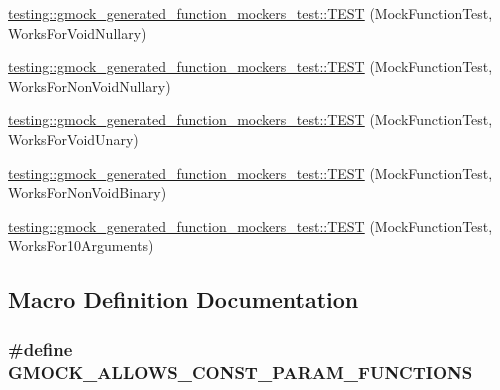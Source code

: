 \begin{DoxyCompactItemize}
\item 
\hyperlink{namespacetesting_1_1gmock__generated__function__mockers__test_a8d67aadbc04fee7e2afc10ee91a76b74}{testing\+::gmock\+\_\+generated\+\_\+function\+\_\+mockers\+\_\+test\+::\+T\+E\+ST} (Mock\+Function\+Test, Works\+For\+Void\+Nullary)
\item 
\hyperlink{namespacetesting_1_1gmock__generated__function__mockers__test_a90817999d7f25ecf280453efb157db84}{testing\+::gmock\+\_\+generated\+\_\+function\+\_\+mockers\+\_\+test\+::\+T\+E\+ST} (Mock\+Function\+Test, Works\+For\+Non\+Void\+Nullary)
\item 
\hyperlink{namespacetesting_1_1gmock__generated__function__mockers__test_ab0e1ede6a1f6ef1774e27f5793a33599}{testing\+::gmock\+\_\+generated\+\_\+function\+\_\+mockers\+\_\+test\+::\+T\+E\+ST} (Mock\+Function\+Test, Works\+For\+Void\+Unary)
\item 
\hyperlink{namespacetesting_1_1gmock__generated__function__mockers__test_ab6337da98bc6bc97100ab177386f3b2b}{testing\+::gmock\+\_\+generated\+\_\+function\+\_\+mockers\+\_\+test\+::\+T\+E\+ST} (Mock\+Function\+Test, Works\+For\+Non\+Void\+Binary)
\item 
\hyperlink{namespacetesting_1_1gmock__generated__function__mockers__test_aa92f0b2b98d76f2c881103a19bed7ba6}{testing\+::gmock\+\_\+generated\+\_\+function\+\_\+mockers\+\_\+test\+::\+T\+E\+ST} (Mock\+Function\+Test, Works\+For10\+Arguments)
\end{DoxyCompactItemize}


\subsection{Macro Definition Documentation}
\subsubsection[{\texorpdfstring{G\+M\+O\+C\+K\+\_\+\+A\+L\+L\+O\+W\+S\+\_\+\+C\+O\+N\+S\+T\+\_\+\+P\+A\+R\+A\+M\+\_\+\+F\+U\+N\+C\+T\+I\+O\+NS}{GMOCK_ALLOWS_CONST_PARAM_FUNCTIONS}}]{\setlength{\rightskip}{0pt plus 5cm}\#define G\+M\+O\+C\+K\+\_\+\+A\+L\+L\+O\+W\+S\+\_\+\+C\+O\+N\+S\+T\+\_\+\+P\+A\+R\+A\+M\+\_\+\+F\+U\+N\+C\+T\+I\+O\+NS}\hypertarget{gmock-generated-function-mockers__test_8cc_af5ea000ce48c75251a5542898a872339}{}\label{gmock-generated-function-mockers__test_8cc_af5ea000ce48c75251a5542898a872339}


